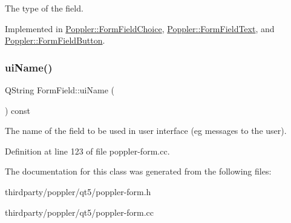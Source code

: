 The type of the field. 

Implemented in \hyperlink{class_poppler_1_1_form_field_choice_a54673d557034b798189e809a0b3120df}{Poppler\+::\+Form\+Field\+Choice}, \hyperlink{class_poppler_1_1_form_field_text_a74337e7ec1ec0b4163a930212f808402}{Poppler\+::\+Form\+Field\+Text}, and \hyperlink{class_poppler_1_1_form_field_button_a2f28ac2dc2ff3e77fac9d4b39a297aad}{Poppler\+::\+Form\+Field\+Button}.

\mbox{\label{class_poppler_1_1_form_field_a76ec302a35ca98ed9c085cb007912d0b}} 
\subsubsection{\texorpdfstring{ui\+Name()}{uiName()}}
{\footnotesize\ttfamily Q\+String Form\+Field\+::ui\+Name (\begin{DoxyParamCaption}{ }\end{DoxyParamCaption}) const}

The name of the field to be used in user interface (eg messages to the user). 

Definition at line 123 of file poppler-\/form.\+cc.



The documentation for this class was generated from the following files\+:\begin{DoxyCompactItemize}
\item 
thirdparty/poppler/qt5/poppler-\/form.\+h\item 
thirdparty/poppler/qt5/poppler-\/form.\+cc\end{DoxyCompactItemize}
